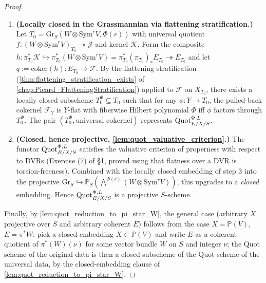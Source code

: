 \begin{proof}
\begin{enumerate}
      whose cokernel is \(q(r) : E_T(r) \to \mathcal{F}(r)\);
      twisting back by \(-r\) recovers \(q\).
    \item \textbf{(Locally closed in the Grassmannian via flattening
      stratification.)} Let \(T_0 = \mathrm{Gr}_S(W \otimes \mathrm{Sym}^r V,
      \Phi(r))\) with universal quotient
      \(f : (W \otimes \mathrm{Sym}^r V)_{T_0} \twoheadrightarrow \mathcal{J}\)
      and kernel \(\mathcal{K}\). Form the composite
      \(h : \pi_{T_0}^* \mathcal{K} \hookrightarrow
      \pi_{T_0}^* (W \otimes \mathrm{Sym}^r V) = \pi_{T_0}^* (\pi_{T_0})_* E_{T_0}
      \twoheadrightarrow E_{T_0}\)
      and let \(q := \mathrm{coker}(h) : E_{T_0} \to \mathcal{F}\). By the
      flattening stratification (\cref{thm:flattening_stratification_exists}
      of \cref{chap:Picard_FlatteningStratification}) applied to \(\mathcal{F}\)
      on \(X_{T_0}\), there exists a locally closed subscheme
      \(T_0^\Phi \subseteq T_0\) such that for any \(\phi : Y \to T_0\), the
      pulled-back cokernel \(\mathcal{F}_Y\) is \(Y\)-flat with fiberwise
      Hilbert polynomial \(\Phi\) iff \(\phi\) factors through \(T_0^\Phi\).
      The pair \((T_0^\Phi, \text{universal cokernel})\) represents
      \(\operatorname{Quot}^{\Phi,L}_{E/X/S}\).
    \item \textbf{(Closed, hence projective,
      \cref{lem:quot_valuative_criterion}.)} The functor
      \(\operatorname{Quot}^{\Phi,L}_{E/X/S}\) satisfies the valuative criterion of
      properness with respect to DVRs (Exercise (7) of \S 1, proved
      using that flatness over a DVR is torsion-freeness). Combined
      with the locally closed embedding of step 3 into the projective
      \(\mathrm{Gr}_S \hookrightarrow \mathbb{P}_S(\bigwedge^{\Phi(r)}
      (W \otimes \mathrm{Sym}^r V))\), this upgrades to a \emph{closed}
      embedding. Hence \(\operatorname{Quot}^{\Phi,L}_{E/X/S}\) is a projective \(S\)-scheme.
  \end{enumerate}
  Finally, by \cref{lem:quot_reduction_to_pi_star_W}, the general case
  (arbitrary \(X\) projective over \(S\) and arbitrary coherent \(E\)) follows
  from the case \(X = \mathbb{P}(V)\), \(E = \pi^* W\): pick a closed
  embedding \(X \subset \mathbb{P}(V)\) and write \(E\) as a coherent quotient
  of \(\pi^*(W)(\nu)\) for some vector bundle \(W\) on \(S\) and integer \(\nu\);
  the Quot scheme of the original data is then a closed subscheme of the
  Quot scheme of the universal data, by the closed-embedding clause of
  \cref{lem:quot_reduction_to_pi_star_W}.
\end{proof}

